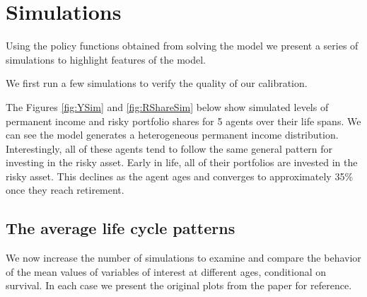 \documentclass[./CGMPortfolio.tex]{subfiles}
\begin{document}
\providecommand{\figName}{Consumption-Policy-Function} %
\providecommand{\figFile}{Cons_Pol} %
\hypertarget{\figFile}{}
\hypertarget{\figName}{}

\hypertarget{Simulations}{}
\section{Simulations}

Using the policy functions obtained from solving the model we present a series of simulations to highlight features of the model.

We first run a few simulations to verify the quality of our calibration.

The Figures \ref{fig:YSim} and \ref{fig:RShareSim} below show simulated levels of permanent income and risky portfolio shares for 5 agents over their life spans. We can see the model generates a heterogeneous permanent income distribution. Interestingly, all of these agents tend to follow the same general pattern for investing in the risky asset. Early in life, all of their portfolios are invested in the risky asset. This declines as the agent ages and converges to approximately 35\% once they reach retirement.

\providecommand{\figName}{Income-Simulation} %
\providecommand{\figFile}{Y_Sim} %
\hypertarget{\figFile}{}
\hypertarget{\figName}{}

\providecommand{\figName}{Risky-Share-Simulation} %
\providecommand{\figFile}{RShare_Sim} %
\hypertarget{\figFile}{}
\hypertarget{\figName}{}

\subsection{The average life cycle patterns}

We now increase the number of simulations to examine and compare the behavior of the mean values of variables of interest at different ages, conditional on survival. In each case we present the original plots from the paper for reference.
\end{document}
